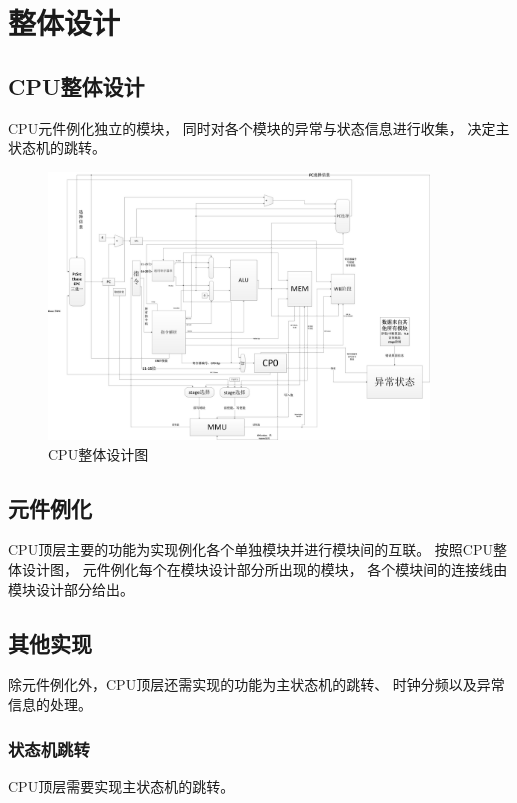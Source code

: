 \section{整体设计}
    \subsection{CPU整体设计}
        CPU元件例化独立的模块，
        同时对各个模块的异常与状态信息进行收集，
        决定主状态机的跳转。

        \begin{figure}[!hbp]
            \centering
            \caption{CPU整体设计图}
            \includegraphics[width=0.9\textwidth]{chart/CPU.jpg}
        \end{figure}

    \subsection{元件例化}
        CPU顶层主要的功能为实现例化各个单独模块并进行模块间的互联。
        按照CPU整体设计图，
        元件例化每个在模块设计部分所出现的模块，
        各个模块间的连接线由模块设计部分给出。

    \subsection{其他实现}
        除元件例化外，CPU顶层还需实现的功能为主状态机的跳转、
        时钟分频以及异常信息的处理。

        \subsubsection{状态机跳转}
            CPU顶层需要实现主状态机的跳转。

